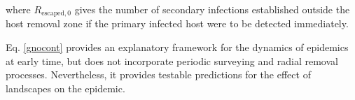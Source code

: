 \documentclass[11pt,letterpaper]{article}
\begin{document}
	where $R_{\mathrm{escaped},0}$ gives the number of secondary infections established outside the host removal zone if the primary infected host were to be detected immediately. 
	
	Eq. \ref{gnocont} provides an explanatory framework for the dynamics of epidemics at early time, but does not incorporate periodic surveying and radial removal processes.  Nevertheless, it provides testable predictions for the effect of landscapes on the epidemic. 
	
	
	
	





\FloatBarrier




\end{document}
